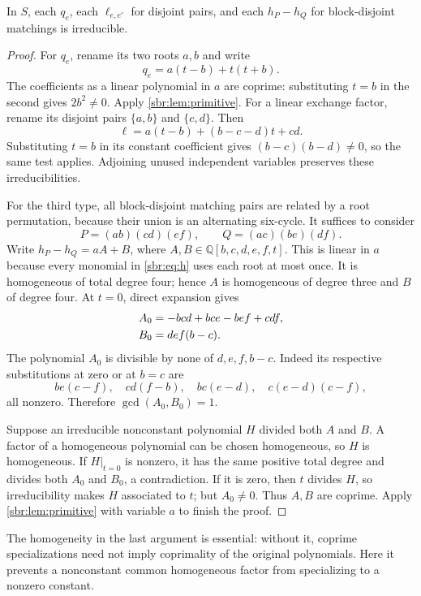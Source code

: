 \documentclass[11pt,letterpaper]{article}
\numberwithin{equation}{section}
\theoremstyle{definition}
\theoremstyle{remark}
\newcommand{\QQ}{\mathbb Q}
\begin{document}
\begin{lemma}
\label{sbr:lem:individual-irred}
In $S$, each $q_e$, each $\ell_{e,e'}$ for disjoint pairs, and each
$h_P-h_Q$ for block-disjoint matchings is irreducible.
\end{lemma}
\begin{proof}
For $q_e$, rename its two roots $a,b$ and write
\[
 q_e=a(t-b)+t(t+b).
\]
The coefficients as a linear polynomial in $a$ are coprime: substituting
$t=b$ in the second gives $2b^2\ne0$. Apply \cref{sbr:lem:primitive}.
For a linear exchange factor, rename its disjoint pairs $\{a,b\}$ and
$\{c,d\}$. Then
\[
 \ell=a(t-b)+(b-c-d)t+cd.
\]
Substituting $t=b$ in its constant coefficient gives
$(b-c)(b-d)\ne0$, so the same test applies. Adjoining unused independent
variables preserves these irreducibilities.

For the third type, all block-disjoint matching pairs are related by a
root permutation, because their union is an alternating six-cycle. It
suffices to consider
\[
 P=(ab)(cd)(ef),\qquad Q=(ac)(be)(df).
\]
Write $h_P-h_Q=aA+B$, where $A,B\in\QQ[b,c,d,e,f,t]$. This is linear in
$a$ because every monomial in \cref{sbr:eq:h} uses each root at most once.
It is homogeneous of total degree four; hence $A$ is homogeneous of
degree three and $B$ of degree four. At $t=0$, direct expansion gives
\begin{align}
 A_0&=-bcd+bce-bef+cdf,\notag\\
 B_0&=def(b-c).
 \label{sbr:eq:primitive-specialization}
\end{align}
The polynomial $A_0$ is divisible by none of $d,e,f,b-c$. Indeed its
respective substitutions at zero or at $b=c$ are
\[
 be(c-f),\quad cd(f-b),\quad bc(e-d),\quad c(e-d)(c-f),
\]
all nonzero. Therefore $\gcd(A_0,B_0)=1$.

Suppose an irreducible nonconstant polynomial $H$ divided both $A$ and
$B$. A factor of a homogeneous polynomial can be chosen homogeneous, so
$H$ is homogeneous. If $H|_{t=0}$ is nonzero, it has the same positive
total degree and divides both $A_0$ and $B_0$, a contradiction. If it is
zero, then $t$ divides $H$, so irreducibility makes $H$ associated to $t$;
but $A_0\ne0$. Thus $A,B$ are coprime. Apply
\cref{sbr:lem:primitive} with variable $a$ to finish the proof.
\end{proof}

The homogeneity in the last argument is essential: without it, coprime
specializations need not imply coprimality of the original polynomials.
Here it prevents a nonconstant common homogeneous factor from specializing
to a nonzero constant.
\end{document}
